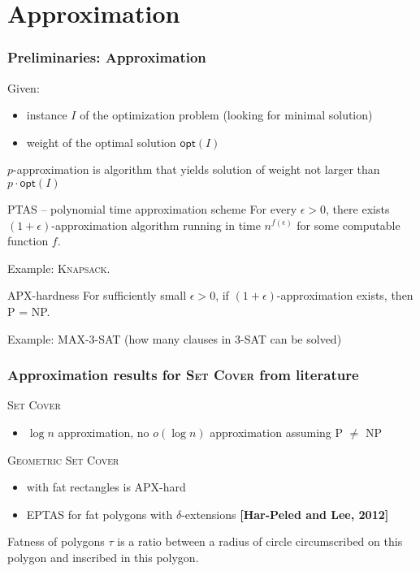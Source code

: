 \documentclass{beamer}
\begin{document}
\section{Approximation}
\begin{frame}
\frametitle{Preliminaries: Approximation}
Given:
\begin{itemize}
\item instance $I$ of the optimization problem (looking for minimal solution)
\item weight of the optimal solution $\mathsf{opt}(I)$
\end{itemize}
$p$-approximation is algorithm that yields solution of weight not larger than
$p\cdot \mathsf{opt}(I)$
\begin{block}{PTAS -- polynomial time approximation scheme}
For every $\epsilon > 0$, there exists $(1+\epsilon)$-approximation
algorithm running in time $n^{f(\epsilon)}$ for some computable function $f$.

Example: \textsc{Knapsack}.

\end{block}

\begin{block}{APX-hardness}
For sufficiently small $\epsilon > 0$,
if $(1+\epsilon)$-approximation exists, then P = NP.

Example: \textsc{MAX-3-SAT} (how many clauses in 3-SAT can be solved)
\end{block}


\end{frame}
\begin{frame}
\frametitle{Approximation results for \textsc{Set Cover} from literature}
\textsc{Set Cover}
\begin{itemize}
\item $\log n$ approximation, no $o(\log n)$ approximation assuming P $\neq$ NP
\end{itemize}

\textsc{Geometric Set Cover}
\begin{itemize}
\item with fat rectangles is APX-hard
\item EPTAS for fat polygons with $\delta$-extensions \textbf{[Har-Peled and Lee, 2012]}
\end{itemize}


\begin{definition}{
Fatness of polygons $\tau$ is a ratio between a radius of circle
circumscribed on this polygon and inscribed in this polygon.
}\end{definition}


\end{frame}
\end{document}
